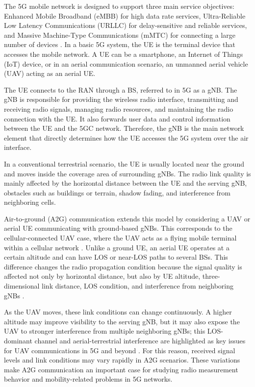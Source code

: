 The 5G mobile network is designed to support three main service objectives: Enhanced Mobile Broadband (eMBB) for high data rate services, Ultra-Reliable Low Latency Communications (URLLC) for delay-sensitive and reliable services, and Massive Machine-Type Communications (mMTC) for connecting a large number of devices \cite{itu_m2083}. In a basic 5G system, the UE is the terminal device that accesses the mobile network. A UE can be a smartphone, an Internet of Things (IoT) device, or in an aerial communication scenario, an unmanned aerial vehicle (UAV) acting as an aerial UE.

The UE connects to the RAN through a BS, referred to in 5G as a gNB. The gNB is responsible for providing the wireless radio interface, transmitting and receiving radio signals, managing radio resources, and maintaining the radio connection with the UE. It also forwards user data and control information between the UE and the 5GC network. Therefore, the gNB is the main network element that directly determines how the UE accesses the 5G system over the air interface.

In a conventional terrestrial scenario, the UE is usually located near the ground and moves inside the coverage area of surrounding gNBs. The radio link quality is mainly affected by the horizontal distance between the UE and the serving gNB, obstacles such as buildings or terrain, shadow fading, and interference from neighboring cells.

Air-to-ground (A2G) communication extends this model by considering a UAV or aerial UE communicating with ground-based gNBs. This corresponds to the cellular-connected UAV case, where the UAV acts as a flying mobile terminal within a cellular network \cite{mozaffari2019tutorial,zeng2019accessing}. Unlike a ground UE, an aerial UE operates at a certain altitude and can have LOS or near-LOS paths to several BSs. This difference changes the radio propagation condition because the signal quality is affected not only by horizontal distance, but also by UE altitude, three-dimensional link distance, LOS condition, and interference from neighboring gNBs \cite{zeng2019accessing}.

As the UAV moves, these link conditions can change continuously. A higher altitude may improve visibility to the serving gNB, but it may also expose the UAV to stronger interference from multiple neighboring gNBs; this LOS-dominant channel and aerial-terrestrial interference are highlighted as key issues for UAV communications in 5G and beyond \cite{zeng2019accessing}. For this reason, received signal levels and link conditions may vary rapidly in A2G scenarios. These variations make A2G communication an important case for studying radio measurement behavior and mobility-related problems in 5G networks.

